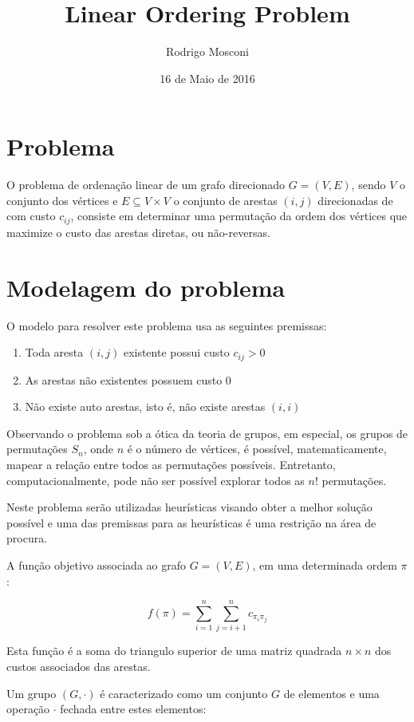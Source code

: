 \documentclass[a4paper,10pt,onecolumn]{article}
\author{Rodrigo Mosconi}
\title{Linear Ordering Problem}
\date{16 de Maio de 2016}
\begin{document}
\maketitle
\tableofcontents

\section{Problema}

O problema de ordenação linear de um grafo direcionado $G=(V,E)$, sendo $V$ o
conjunto dos vértices e $E \subseteq V\times V$ o conjunto de arestas $(i,j)$
direcionadas de com custo $c_{ij}$, consiste em determinar uma permutação da
ordem dos vértices que maximize o custo das arestas diretas, ou não-reversas.

\section{Modelagem do problema}

O modelo para resolver este problema usa as seguintes premissas:
\begin{enumerate}
\item Toda aresta $(i,j)$ existente possui custo $c_{ij}>0$
\item As arestas não existentes possuem custo $0$
\item Não existe auto arestas, isto é, não existe arestas $(i,i)$
\end{enumerate}

Observando o problema sob a ótica da teoria de grupos, em especial, os grupos
de permutações $S_n$, onde $n$ é o número de vértices, é possível,
matematicamente, mapear a relação entre todos as permutações possíveis.
Entretanto, computacionalmente, pode não ser possível explorar todos as $n!$
permutações.  

Neste problema serão utilizadas heurísticas visando obter a melhor solução
possível e uma das premissas para as heurísticas é uma restrição na área de
procura.

A função objetivo associada ao  grafo $G=(V,E)$, em uma determinada ordem $\pi$:

\begin{equation}
  f(\pi)=\sum^n_{i=1}\sum^n_{j=i+1}c_{\pi_i\pi_j}
\end{equation}

Esta função é a soma do triangulo superior de uma matriz quadrada $n\times n$
dos custos associados das arestas.

Um grupo $(G,\cdot)$ é caracterizado como um conjunto $G$ de elementos e uma
operação $\cdot$ fechada entre estes elementos:
\end{document}
